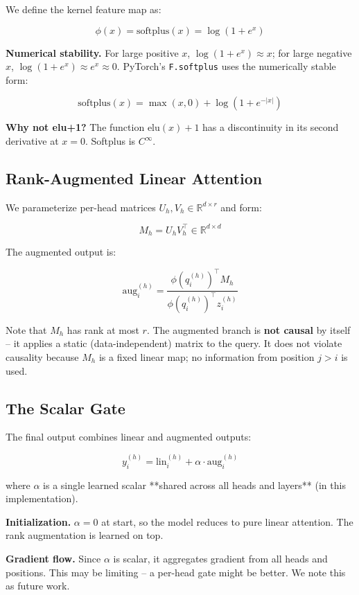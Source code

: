 We define the kernel feature map as:

\[
\phi(x) = \mathrm{softplus}(x) = \log(1 + e^x)
\tag{4.1}
\]

\textbf{Numerical stability.} For large positive $x$, $\log(1 + e^x) \approx x$; 
for large negative $x$, $\log(1 + e^x) \approx e^x \approx 0$. PyTorch's 
\texttt{F.softplus} uses the numerically stable form:

\[
\mathrm{softplus}(x) = \max(x, 0) + \log(1 + e^{-|x|})
\tag{4.2}
\]

\textbf{Why not elu+1?} The function $\mathrm{elu}(x) + 1$ has a discontinuity 
in its second derivative at $x = 0$. Softplus is $C^\infty$.

\subsection{Rank-Augmented Linear Attention}

We parameterize per-head matrices $U_h, V_h \in \mathbb{R}^{d \times r}$ and 
form:

\[
M_h = U_h V_h^\top \in \mathbb{R}^{d \times d}
\tag{4.3}
\]

The augmented output is:

\[
\text{aug}_i^{(h)} = \frac{\phi(q_i^{(h)})^\top M_h}{\phi(q_i^{(h)})^\top z_i^{(h)}}
\tag{4.4}
\]

Note that $M_h$ has rank at most $r$. The augmented branch is \textbf{not causal} 
by itself -- it applies a static (data-independent) matrix to the query. It 
does not violate causality because $M_h$ is a fixed linear map; no 
information from position $j > i$ is used.

\subsection{The Scalar Gate}

The final output combines linear and augmented outputs:

\[
y_i^{(h)} = \text{lin}_i^{(h)} + \alpha \cdot \text{aug}_i^{(h)}
\tag{4.5}
\]

where $\alpha$ is a single learned scalar **shared across all heads and 
layers** (in this implementation).

\textbf{Initialization.} $\alpha = 0$ at start, so the model reduces to pure 
linear attention. The rank augmentation is learned on top.

\textbf{Gradient flow.} Since $\alpha$ is scalar, it aggregates gradient from all 
heads and positions. This may be limiting -- a per-head gate might be better. 
We note this as future work.


